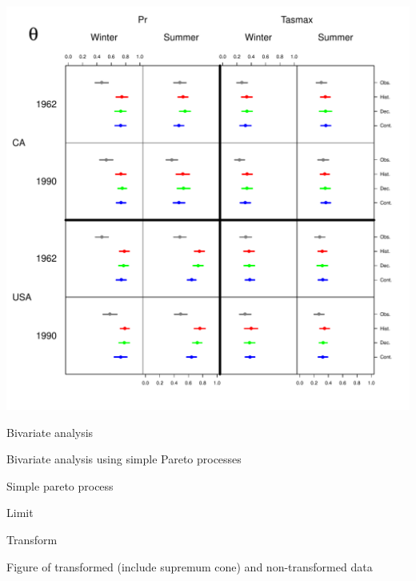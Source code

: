 \documentclass[mathserif, 11pt, t]{beamer}
\begin{document}
\begin{frame}
\begin{center}
\includegraphics[scale=0.34]{figs/theta.pdf}
\end{center}
\end{frame}


\begin{frame}{Bivariate analysis}

Bivariate analysis using simple Pareto processes

\end{frame}

\begin{frame}{Simple pareto process}

Limit

Transform

Figure of transformed (include supremum cone) and non-transformed data

\end{frame}

\begin{frame}{}
\end{frame}
\end{document}
